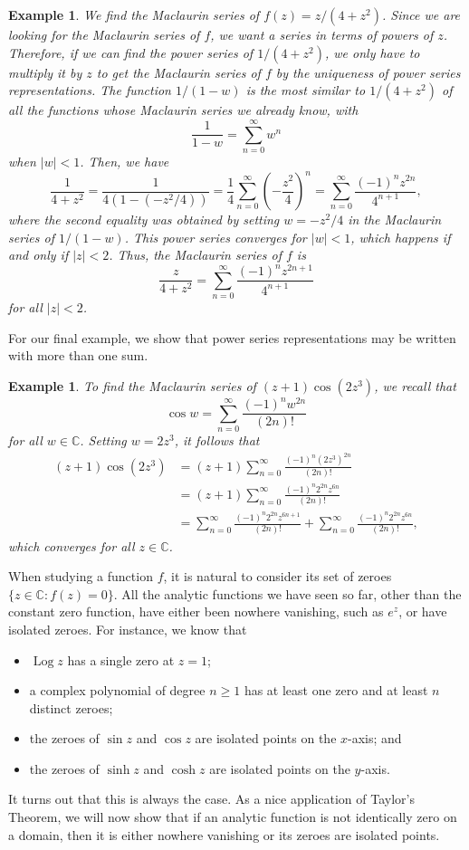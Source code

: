 \documentclass[10pt]{article}
\newcommand{\C}{\mathbb{C}}
\DeclareMathOperator{\Log}{Log}
\theoremstyle{newstyle}
\newtheorem{exmp}[thm]{Example}
\begin{document}
\begin{exmp}
We find the Maclaurin series of $f(z) = z/(4+z^2)$. Since we are looking for the Maclaurin 
series of $f$, we want a series in terms of powers of $z$. Therefore, if we can find the 
power series of $1/(4+z^2)$, we only have to multiply it by $z$ to get the Maclaurin 
series of $f$ by the uniqueness of power series representations. The function 
$1/(1-w)$ is the most similar to $1/(4+z^2)$ of all the functions whose Maclaurin series 
we already know, with 
\[ \frac{1}{1-w} = \sum_{n=0}^\infty w^n \]
when $|w| < 1$. Then, we have 
\[ \frac{1}{4+z^2} = \frac{1}{4(1-(-z^2/4))} = \frac14 \sum_{n=0}^\infty \left( -\frac{z^2}4 \right)^n 
= \sum_{n=0}^\infty \frac{(-1)^n z^{2n}}{4^{n+1}}, \]
where the second equality was obtained by setting $w = -z^2/4$ in the Maclaurin series of 
$1/(1-w)$. This power series converges for $|w| < 1$, which happens if and only if $|z| < 2$. 
Thus, the Maclaurin series of $f$ is 
\[ \frac{z}{4+z^2} = \sum_{n=0}^\infty \frac{(-1)^n z^{2n+1}}{4^{n+1}} \]
for all $|z| < 2$. 
\end{exmp}

For our final example, we show that power series representations may be written with more than one sum. 

\begin{exmp}
To find the Maclaurin series of $(z+1)\cos(2z^3)$, we recall that 
\[ \cos w = \sum_{n=0}^\infty \frac{(-1)^n w^{2n}}{(2n)!} \]
for all $w \in \C$. Setting $w = 2z^3$, it follows that 
\begin{align*}
    (z+1)\cos(2z^3) 
    &= (z+1) \sum_{n=0}^\infty \frac{(-1)^n(2z^3)^{2n}}{(2n)!} \\
    &= (z+1) \sum_{n=0}^\infty \frac{(-1)^n 2^{2n} z^{6n}}{(2n)!} \\
    &= \sum_{n=0}^\infty \frac{(-1)^n 2^{2n} z^{6n+1}}{(2n)!} + \sum_{n=0}^\infty \frac{(-1)^n 2^{2n} z^{6n}}{(2n)!},
\end{align*}
which converges for all $z \in \C$. 
\end{exmp}

When studying a function $f$, it is natural to consider its set of zeroes 
$\{z \in \C : f(z) = 0\}$. All the analytic functions we have seen so far, 
other than the constant zero function, have either been nowhere vanishing, 
such as $e^z$, or have isolated zeroes. For instance, we know that 
\begin{itemize}
    \item $\Log z$ has a single zero at $z = 1$;
    \item a complex polynomial of degree $n \geq 1$ has at least one zero and at least $n$ 
    distinct zeroes;
    \item the zeroes of $\sin z$ and $\cos z$ are isolated points on the $x$-axis; and 
    \item the zeroes of $\sinh z$ and $\cosh z$ are isolated points on the $y$-axis. 
\end{itemize}
It turns out that this is always the case. As a nice application of Taylor's Theorem, we will
now show that if an analytic function is not identically zero on a domain, then it is 
either nowhere vanishing or its zeroes are isolated points. 
\end{document}

